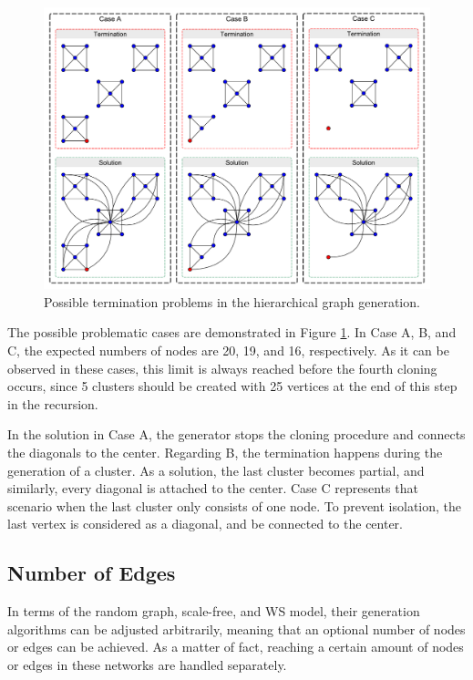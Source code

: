 \begin{figure}[!ht]
	\centering
	\includegraphics[width=150mm, keepaspectratio]{figures/hierarchical.pdf}
	\caption{Possible termination problems in the hierarchical graph generation.}
	\label{fig:hierarchical_problems}
\end{figure}

The possible problematic cases are demonstrated in Figure \ref{fig:hierarchical_problems}. In \textsf{Case A}, \textsf{B}, and \textsf{C}, the expected numbers of nodes are 20, 19, and 16, respectively. As it can be observed in these cases, this limit is always reached before the fourth cloning occurs, since 5 clusters should be created with 25 vertices at the end of this step in the recursion.

In the solution in \textsf{Case A}, the generator stops the cloning procedure and connects the diagonals to the center. Regarding \textsf{B}, the termination happens during the generation of a cluster. As a solution, the last cluster becomes partial, and similarly, every diagonal is attached to the center. \textsf{Case C} represents that scenario when the last cluster only consists of one node. To prevent isolation, the last vertex is considered as a diagonal, and be connected to the center.

\subsection{Number of Edges}

In terms of the random graph, scale-free, and WS model, their generation algorithms can be adjusted arbitrarily, meaning that an optional number of nodes or edges can be achieved. As a matter of fact, reaching a certain amount of nodes or edges in these networks are handled separately.

